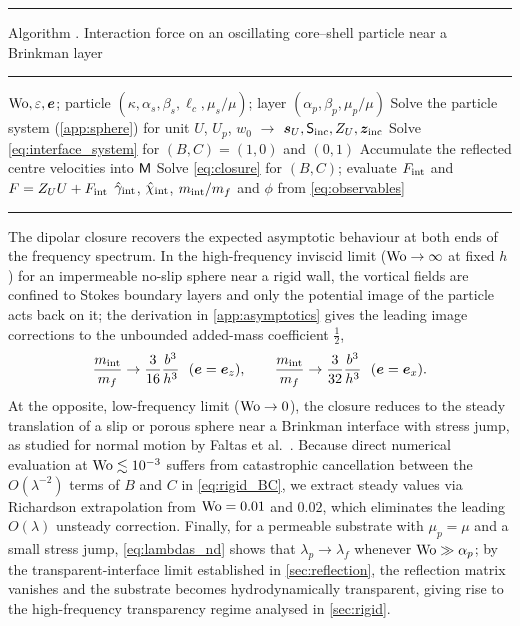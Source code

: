 \begin{center}\begin{minipage}{\linewidth}\small
\hrule\smallskip
{}\label{alg:force}%
\noindent Algorithm \thealgorithm. Interaction force on an oscillating core--shell particle near a Brinkman layer
\smallskip\hrule\smallskip
\begin{algorithmic}[1]
\Require $\mathrm{Wo},\varepsilon,\bm{e}$; particle $(\kappa,\alpha_s,\beta_s,\hat\ell_c,\mu_s/\mu)$; layer $(\alpha_p,\beta_p,\mu_p/\mu)$
\State Solve the particle system (\cref{app:sphere}) for unit $U$, $U_p$, $w_0$ $\to$ $\bm s_U,\mathsf S_{\rm inc},Z_U,\bm z_{\rm inc}$
 
  \State Solve \cref{eq:interface_system} for $(B,C)=(1,0)$ and $(0,1)$
  \State Accumulate the reflected centre velocities into $\mathsf{M}$
\EndFor
\State Solve \cref{eq:closure} for $(B,C)$; evaluate $F_{\rm int}$ and $F=Z_UU+F_{\rm int}$
\State \Return $\hat\gamma_{\rm int}$, $\hat\chi_{\rm int}$, $m_{\rm int}/m_f$ and $\phi$ from \cref{eq:observables}
\end{algorithmic}
\smallskip\hrule
\end{minipage}\end{center}

The dipolar closure recovers the expected asymptotic behaviour at both ends of the frequency spectrum. In the
high-frequency inviscid limit ($\mathrm{Wo}\to\infty$ at fixed $h$) for an impermeable no-slip sphere near a rigid wall, the
vortical fields are confined to Stokes boundary layers and only the potential image of the particle acts back on it; the
derivation in \cref{app:asymptotics} gives the leading image corrections to the unbounded added-mass coefficient
$\tfrac12$,
\begin{equation}
  \frac{m_{\rm int}}{m_f}\to\frac{3}{16}\frac{b^3}{h^3}\ \ (\bm{e}=\bm{e}_z),\qquad
  \frac{m_{\rm int}}{m_f}\to\frac{3}{32}\frac{b^3}{h^3}\ \ (\bm{e}=\bm{e}_x).
  \label{eq:inviscid}
\end{equation}
At the opposite, low-frequency limit ($\mathrm{Wo}\to0$), the closure reduces to the steady translation of a slip or porous sphere
near a Brinkman interface with stress jump, as studied for normal motion by Faltas et al.~\cite{faltas2021axisymmetric}.
Because direct numerical evaluation at $\mathrm{Wo}\lesssim10^{-3}$ suffers from catastrophic cancellation between the
$O(\lambda^{-2})$ terms of $B$ and $C$ in \cref{eq:rigid_BC}, we extract steady values via Richardson extrapolation from
$\mathrm{Wo}=0.01$ and $0.02$, which eliminates the leading $O(\lambda)$ unsteady correction. Finally, for a permeable substrate
with $\mu_p=\mu$ and a small stress jump, \cref{eq:lambdas_nd} shows that $\lambda_p\to\lambda_f$ whenever
$\mathrm{Wo}\gg\alpha_p$; by the transparent-interface limit established in \cref{sec:reflection}, the reflection matrix vanishes
and the substrate becomes hydrodynamically transparent, giving rise to the high-frequency transparency regime analysed in
\cref{sec:rigid}.
